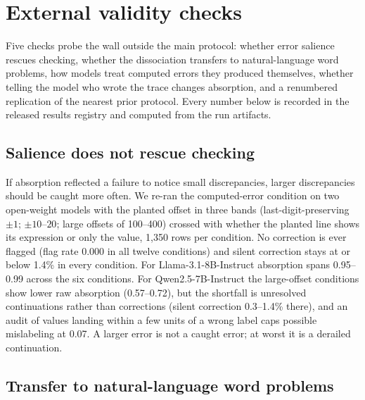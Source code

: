 \section{External validity checks}
\label{app:external}

Five checks probe the wall outside the main protocol: whether error salience rescues checking, whether the dissociation transfers to natural-language word problems, how models treat computed errors they produced themselves, whether telling the model who wrote the trace changes absorption, and a renumbered replication of the nearest prior protocol. Every number below is recorded in the released results registry and computed from the run artifacts.

\subsection{Salience does not rescue checking}
\label{app:salience}

If absorption reflected a failure to notice small discrepancies, larger discrepancies should be caught more often. We re-ran the computed-error condition on two open-weight models with the planted offset in three bands (last-digit-preserving $\pm1$; $\pm10$--$20$; large offsets of 100--400) crossed with whether the planted line shows its expression or only the value, 1{,}350 rows per condition. No correction is ever flagged (flag rate 0.000 in all twelve conditions) and silent correction stays at or below 1.4\% in every condition. For Llama-3.1-8B-Instruct absorption spans 0.95--0.99 across the six conditions. For Qwen2.5-7B-Instruct the large-offset conditions show lower raw absorption (0.57--0.72), but the shortfall is unresolved continuations rather than corrections (silent correction 0.3--1.4\% there), and an audit of values landing within a few units of a wrong label caps possible mislabeling at 0.07. A larger error is not a caught error; at worst it is a derailed continuation.

\subsection{Transfer to natural-language word problems}
\label{app:nl}

